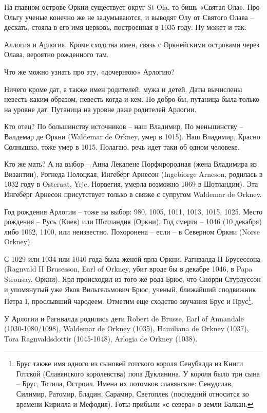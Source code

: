 На главном острове Оркни существует округ St Ola, то бишь «Святая Ола». Про Ольгу ученые конечно же не задумываются, и выводят Олу от Святого Олава – дескать, стояла в его имя церковь, построенная в 1035 году. Ну может и так. 

Аллогия и Арлогия. Кроме сходства имен, связь с Оркнейскими островами через Олава, вероятно рожденного там.

Что же можно узнать про эту, «дочернюю» Арлогию? 

Ничего кроме дат, а также имен родителей, мужа и детей. Даты вычислены невесть каким образом, невесть когда и кем. Но добро бы, путаница была только на уровне дат. Путаница на уровне даже родителей Арлогии.

Кто отец? По большинству источников – наш Владимир. По меньшинству – Валдемар де Оркни (Waldemar de Orkney, умер в 1015). Наш Владимир, Красно Солнышко, тоже умер в 1015. Полагаю, речь идет таки об одном человеке.

Кто же мать? А на выбор – Анна Лекапене Порфирородная (жена Владимира из Византии), Рогнеда Полоцкая, Ингебёрг Арнесон (Ingebiorge Arneson, родилась в 1032 году в Osteraat, Yrje, Норвегия, умерла возможно 1069 в Шотландии). Эта Ингебёрг Арнесон присутствует только в связке с супругом Waldemar de Orkney.

Год рождения Арлогии – тоже на выбор: 980, 1005, 1011, 1013, 1015, 1025. Место рождения – Русь (Киев) или Шотландия (Оркни). Год смерти – 1046 (10 декабря) либо 1062, 1100, или неизвестно. Похоронена – если – в Северном Оркни (Norse Orkney).

С 1029 или 1034 или 1040 года была женой ярла Оркни, Рагнвалда II Брусессона (Ragnvald II Brusesson, Earl of Orkney, убит вроде бы в декабре 1046, в Papa Stronsay, Оркни). Ярл происходил из того же рода Брюс, что Снорри Стурлуссон и упомянутый уже Яков Вильгельмович Брюс, ученый, ближайший сподвижник Петра I, прослывший чародеем. Отметим еще сходство звучания Брус и Прус\footnote{Брус также имя одного из сыновей готского короля Сенубалда из Книги Готской (Славянского королевства) попа Дуклянина. У короля было три сына – Брус, Тотила, Остроил. Имена их потомков славянские: Сенудслав, Силимир, Ратомир, Бладин, Сарамир, Светоплек (последний относится ко времени Кирилла и Мефодия). Готы прибыли «с севера» в земли Балкан.}.

У Арлогии и Рагнвалда родились дети Robert de Brusse, Earl of Annandale (1030-1080/1098), Waldemar de Orkney (1035), Hamiliana de Orkney (1037), Tora Ragnvaldsdottir (1045-1048), Arlogia de Orkney (1038). 

